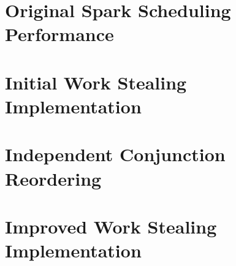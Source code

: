 \section{Original Spark Scheduling Performance}
\label{sec:original_scheduling_performance}



\section{Initial Work Stealing Implementation}
\label{sec:rts_work_stealing}



\section{Independent Conjunction Reordering}
\label{sec:rts_reorder}



%
%

\section{Improved Work Stealing Implementation}
\label{sec:rts_work_stealing2}



%

